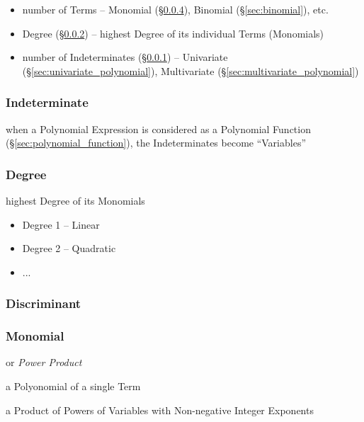 \begin{itemize}
  \item number of Terms -- Monomial (\S\ref{sec:monomial}), Binomial
    (\S\ref{sec:binomial}), etc.
  \item Degree (\S\ref{sec:degree}) -- highest Degree of its individual Terms
    (Monomials)
  \item number of Indeterminates (\S\ref{sec:indeterminate}) -- Univariate
    (\S\ref{sec:univariate_polynomial}), Multivariate
    (\S\ref{sec:multivariate_polynomial})
\end{itemize}



\subsubsection{Indeterminate}\label{sec:indeterminate}

when a Polynomial Expression is considered as a Polynomial Function
(\S\ref{sec:polynomial_function}), the Indeterminates become ``Variables''



\subsubsection{Degree}\label{sec:degree}

highest Degree of its Monomials

\begin{itemize}
  \item Degree 1 -- Linear
  \item Degree 2 -- Quadratic
  \item ...
\end{itemize}



\subsubsection{Discriminant}\label{sec:discriminant}

\subsubsection{Monomial}\label{sec:monomial}

or \emph{Power Product}

a Polyonomial of a single Term

a Product of Powers of Variables with Non-negative Integer Exponents

